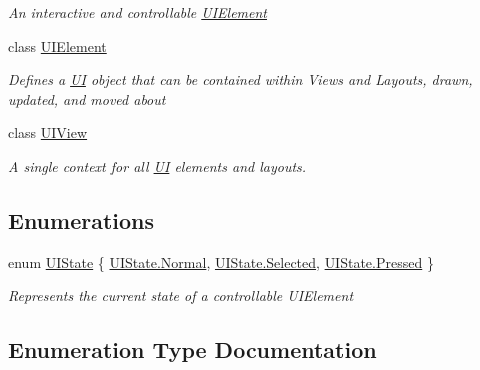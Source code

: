 \begin{DoxyCompactItemize}
\begin{DoxyCompactList}\small\item\em An interactive and controllable \hyperlink{class_m_b2_d_1_1_u_i_1_1_u_i_element}{U\+I\+Element} \end{DoxyCompactList}\item 
class \hyperlink{class_m_b2_d_1_1_u_i_1_1_u_i_element}{U\+I\+Element}
\begin{DoxyCompactList}\small\item\em Defines a \hyperlink{namespace_m_b2_d_1_1_u_i}{UI} object that can be contained within Views and Layouts, drawn, updated, and moved about \end{DoxyCompactList}\item 
class \hyperlink{class_m_b2_d_1_1_u_i_1_1_u_i_view}{U\+I\+View}
\begin{DoxyCompactList}\small\item\em A single context for all \hyperlink{namespace_m_b2_d_1_1_u_i}{UI} elements and layouts. \end{DoxyCompactList}\end{DoxyCompactItemize}
\subsection*{Enumerations}
\begin{DoxyCompactItemize}
\item 
enum \hyperlink{namespace_m_b2_d_1_1_u_i_a3d5fed7e80959a1444165894dfd9e75b}{U\+I\+State} \{ \hyperlink{namespace_m_b2_d_1_1_u_i_a3d5fed7e80959a1444165894dfd9e75ba960b44c579bc2f6818d2daaf9e4c16f0}{U\+I\+State.\+Normal}, 
\hyperlink{namespace_m_b2_d_1_1_u_i_a3d5fed7e80959a1444165894dfd9e75ba91b442d385b54e1418d81adc34871053}{U\+I\+State.\+Selected}, 
\hyperlink{namespace_m_b2_d_1_1_u_i_a3d5fed7e80959a1444165894dfd9e75bad78a68f6a85421ae121c2cb5b73a1040}{U\+I\+State.\+Pressed}
 \}\begin{DoxyCompactList}\small\item\em Represents the current state of a controllable U\+I\+Element \end{DoxyCompactList}
\end{DoxyCompactItemize}


\subsection{Enumeration Type Documentation}
\hypertarget{namespace_m_b2_d_1_1_u_i_a3d5fed7e80959a1444165894dfd9e75b}{}\label{namespace_m_b2_d_1_1_u_i_a3d5fed7e80959a1444165894dfd9e75b} 
